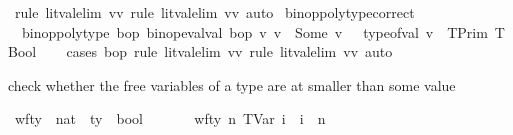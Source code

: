 \begin{isabellebody}
\isamarkupfalse%
\ {\isacharparenleft}{\kern0pt}rule\ lit{\isacharunderscore}{\kern0pt}val{\isacharunderscore}{\kern0pt}elim{\isacharbrackleft}{\kern0pt}\ v{\isacharequal}{\kern0pt}v{}{\isacharbrackright}{\kern0pt}{\isacharsemicolon}{\kern0pt}\ rule\ lit{\isacharunderscore}{\kern0pt}val{\isacharunderscore}{\kern0pt}elim{\isacharbrackleft}{\kern0pt}\ v{\isacharequal}{\kern0pt}v{}{\isacharbrackright}{\kern0pt}{\isacharsemicolon}{\kern0pt}\ auto{\isacharparenright}{\kern0pt}%
\endisatagproof
{\isafoldproof}%
%
\isadelimproof
\isanewline
%
\endisadelimproof
\isanewline
{}\isamarkupfalse%
\ binop{\isacharunderscore}{\kern0pt}poly{\isacharunderscore}{\kern0pt}type{\isacharunderscore}{\kern0pt}correct{\isacharcolon}{\kern0pt}\isanewline
\ {\isachardoublequoteopen}{\isasymlbrakk}\ binop{\isacharunderscore}{\kern0pt}poly{\isacharunderscore}{\kern0pt}type\ bop{\isacharsemicolon}{\kern0pt}\ binop{\isacharunderscore}{\kern0pt}eval{\isacharunderscore}{\kern0pt}val\ bop\ v{}\ v{}\ {\isacharequal}{\kern0pt}\ Some\ v\ {\isasymrbrakk}\ {\isasymLongrightarrow}\ type{\isacharunderscore}{\kern0pt}of{\isacharunderscore}{\kern0pt}val\ v\ {\isacharequal}{\kern0pt}\ TPrim\ TBool{\isachardoublequoteclose}\isanewline
%
\isadelimproof
\ \ %
\endisadelimproof
%
\isatagproof
{}\isamarkupfalse%
\ {\isacharparenleft}{\kern0pt}cases\ bop{\isacharsemicolon}{\kern0pt}\ rule\ lit{\isacharunderscore}{\kern0pt}val{\isacharunderscore}{\kern0pt}elim{\isacharbrackleft}{\kern0pt}\ v{\isacharequal}{\kern0pt}v{}{\isacharbrackright}{\kern0pt}{\isacharsemicolon}{\kern0pt}\ rule\ lit{\isacharunderscore}{\kern0pt}val{\isacharunderscore}{\kern0pt}elim{\isacharbrackleft}{\kern0pt}\ v{\isacharequal}{\kern0pt}v{}{\isacharbrackright}{\kern0pt}{\isacharsemicolon}{\kern0pt}\ auto{\isacharparenright}{\kern0pt}%
\endisatagproof
{\isafoldproof}%
%
\isadelimproof
%
\endisadelimproof
%
\begin{isamarkuptext}%
check whether the free variables of a type are at smaller than some value%
\end{isamarkuptext}\isamarkuptrue%
\isamarkupfalse%
\ wf{\isacharunderscore}{\kern0pt}ty\ {\isacharcolon}{\kern0pt}{\isacharcolon}{\kern0pt}\ {\isachardoublequoteopen}nat\ {\isasymRightarrow}\ ty\ {\isasymRightarrow}\ bool{\isachardoublequoteclose}\isanewline
\ \ \ \isanewline
\ \ \ {\isachardoublequoteopen}wf{\isacharunderscore}{\kern0pt}ty\ n\ {\isacharparenleft}{\kern0pt}TVar\ i{\isacharparenright}{\kern0pt}\ {\isacharequal}{\kern0pt}\ {\isacharparenleft}{\kern0pt}i\ {\isacharless}{\kern0pt}\ n{\isacharparenright}{\kern0pt}{\isachardoublequoteclose}\isanewline

\end{isabellebody}
